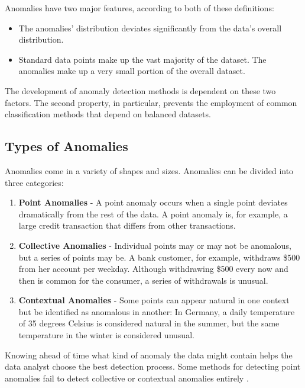 Anomalies have two major features, according to both of these definitions:

\begin{itemize}
	\item The anomalies' distribution deviates significantly from the data's overall distribution.
	\item Standard data points make up the vast majority of the dataset. The anomalies make up a very small portion of the overall dataset.
\end{itemize}

The development of anomaly detection methods is dependent on these two factors. The second property, in particular, prevents the employment of common classification methods that depend on balanced datasets.

\subsection{Types of Anomalies}
Anomalies come in a variety of shapes and sizes. Anomalies can be divided into three categories:

\begin{enumerate}
	\item \textbf{Point Anomalies} - A point anomaly occurs when a single point deviates dramatically from the rest of the data.
	A point anomaly is, for example, a large credit transaction that differs from other transactions.
	\item \textbf{Collective Anomalies} - Individual points may or may not be anomalous, but a series of points may be. A bank customer, for example, withdraws \$500 from her account per weekday. Although withdrawing \$500 every now and then is common for the consumer, a series of withdrawals is unusual.
	\item \textbf{Contextual Anomalies} - Some points can appear natural in one context but be identified as anomalous in another: In Germany, a daily temperature of 35 degrees Celsius is considered natural in the summer, but the same temperature in the winter is considered unusual.
\end{enumerate}

Knowing ahead of time what kind of anomaly the data might contain helps the data analyst choose the best detection process. Some methods for detecting point anomalies fail to detect collective or contextual anomalies entirely \parencite{Braei2020}.

